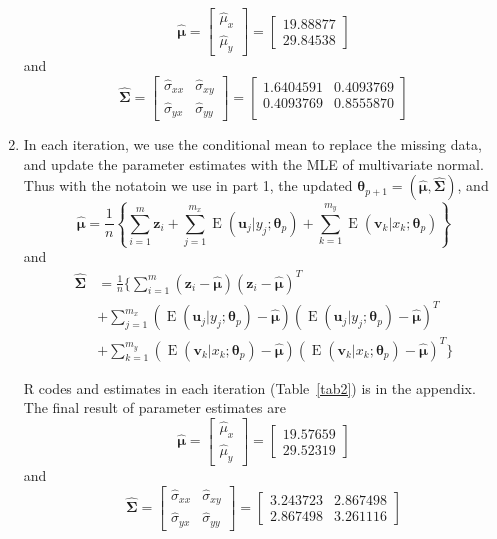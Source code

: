 \documentclass{article}
\DeclareMathOperator{\E}{E}
\begin{document}
\begin{enumerate}[font = \bfseries, leftmargin = 0 em]
		\[\hat{\bm \mu} = \begin{bmatrix}
			\hat{\mu}_x\\
			\hat{\mu}_y
		\end{bmatrix} = \begin{bmatrix}
              19.88877\\
              29.84538 
		\end{bmatrix}\]
		and 
		\[\hat{\bm \Sigma} = \begin{bmatrix}
			\hat{\sigma}_{xx} & \hat{\sigma}_{xy}\\
			\hat{\sigma}_{yx} & \hat{\sigma}_{yy}
		\end{bmatrix} = \begin{bmatrix}
                   1.6404591& 0.4093769\\
                   0.4093769& 0.8555870\\
		\end{bmatrix}\]

		\vspace{5 em}


		\item 

		In each iteration, we use the conditional mean to replace the missing data, and update the parameter estimates with the MLE of multivariate normal. Thus with the notatoin we use in part 1, the updated $\bm \theta_{p+1} = (\hat{\bm \mu}, \hat{\bm \Sigma})$, and
	\[\hat{\bm \mu} = \frac{1}{n}\left\{\sum_{i=1}^m \bm z_i + \sum_{j = 1}^{m_x}\E(\bm u_j|y_j; \bm \theta_p) + \sum_{k=1}^{m_y} \E(\bm v_k|x_k; \bm \theta_p)\right\}\]
	and
	\begin{align*}
	\hat{\bm \Sigma} &= \frac{1}{n}\bigg\{ \sum_{i=1}^m (\bm z_i - \hat{\bm \mu})(\bm z_i - \hat{\bm \mu})^T\\
		& + \sum_{j=1}^{m_x}\left(\E(\bm u_j|y_j; \bm \theta_p) - \hat{\bm \mu}\right)\left(\E(\bm u_j|y_j; \bm \theta_p) - \hat{\bm \mu}\right)^T\\
		& + \sum_{k=1}^{m_y}\left(\E(\bm v_k|x_k; \bm \theta_p) - \hat{\bm \mu}\right)\left(\E(\bm v_k|x_k; \bm \theta_p) - \hat{\bm \mu}\right)^T\bigg\}\end{align*}  

		R codes and estimates in each iteration (Table~\ref{tab2}) is in the appendix. The final result of parameter estimates are
		\[\hat{\bm \mu} = \begin{bmatrix}
			\hat{\mu}_x\\
			\hat{\mu}_y
		\end{bmatrix} = \begin{bmatrix}
			19.57659\\
			29.52319
		\end{bmatrix}\]
		and 
		\[\hat{\bm \Sigma} = \begin{bmatrix}
			\hat{\sigma}_{xx} & \hat{\sigma}_{xy}\\
			\hat{\sigma}_{yx} & \hat{\sigma}_{yy}
		\end{bmatrix} = \begin{bmatrix}
			     3.243723 &2.867498\\
                 2.867498 &3.261116
		\end{bmatrix}\]
		\newpage


\end{enumerate}
\end{document}

